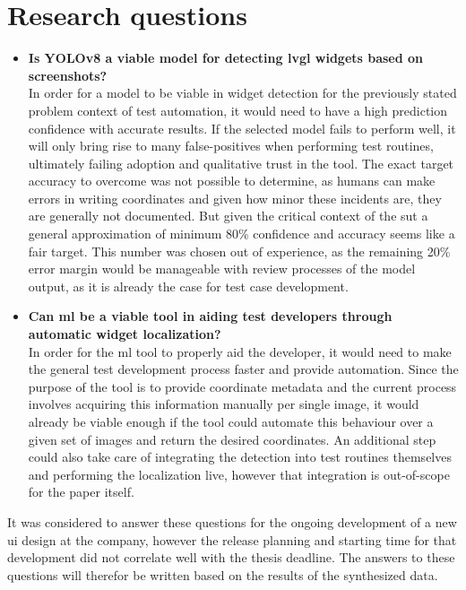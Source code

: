 \documentclass[Bachelor, BIC, english, fhCitStyle, IEEE]{BASE/twbook} %
\begin{document}
\chapter{Research questions}
\begin{itemize}
    \item \textbf{Is YOLOv8 a viable model for detecting \ac{lvgl} widgets based on screenshots?}\\
    In order for a model to be viable in widget detection for the previously stated problem context of test automation, it would need to have a high prediction confidence with accurate results. If the selected model fails to perform well, it will only bring rise to many false-positives when performing test routines, ultimately failing adoption and qualitative trust in the tool. The exact target accuracy to overcome was not possible to determine, as humans can make errors in writing coordinates and given how minor these incidents are, they are generally not documented. But given the critical context of the \ac{sut} a general approximation of minimum 80\% confidence and accuracy seems like a fair target. This number was chosen out of experience, as the remaining 20\% error margin would be manageable with review processes of the model output, as it is already the case for test case development.
    \item \textbf{Can \ac{ml} be a viable tool in aiding test developers through automatic widget localization?}\\
    In order for the \ac{ml} tool to properly aid the developer, it would need to make the general test development process faster and provide automation. Since the purpose of the tool is to provide coordinate metadata and the current process involves acquiring this information manually per single image, it would already be viable enough if the tool could automate this behaviour over a given set of images and return the desired coordinates. An additional step could also take care of integrating the detection into test routines themselves and performing the localization live, however that integration is out-of-scope for the paper itself.
\end{itemize}
It was considered to answer these questions for the ongoing development of a new \ac{ui} design at the company, however the release planning and starting time for that development did not correlate well with the thesis deadline. The answers to these questions will therefor be written based on the results of the synthesized data.
\clearpage
\end{document}
